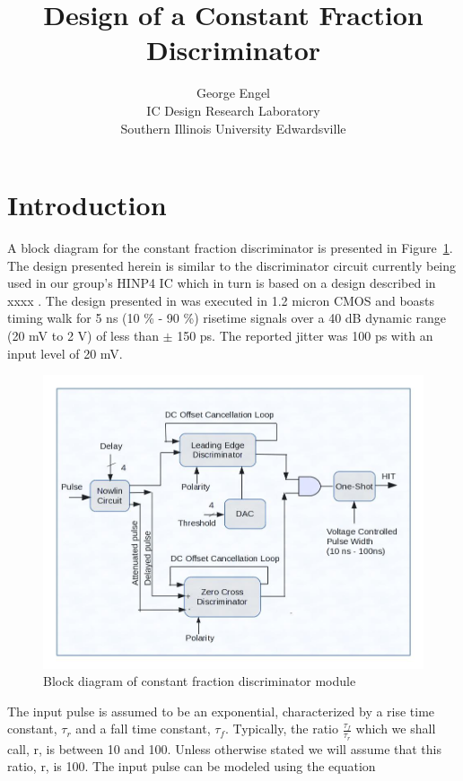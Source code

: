 \documentclass[12pt, onecolumn]{IEEEtran}
\author{George Engel\\
IC Design Research Laboratory\\
Southern Illinois University Edwardsville\\
}
\title{Design of a Constant Fraction Discriminator}
\begin{document}

\maketitle


\section*{Introduction}


A block diagram for the constant fraction discriminator is presented in Figure~\ref{FIG:CFD_BLOCK_DIAGRAM}.
The design presented herein is similar to the discriminator circuit currently being used in our group's HINP4 IC which in turn is based on a design described in xxxx . The design presented in \cite{507173} was executed in 1.2 micron CMOS and boasts timing walk for 5 ns (10 \% - 90 \%) risetime signals over a 40 dB dynamic range (20 mV to 2 V) of less than $\pm$ 150 ps.  The reported jitter was 100 ps with an input level of 20 mV. 


\begin{figure}[htbp!]
	\centering
 	\includegraphics[scale=0.5,keepaspectratio=true]{./images/cfd_block_diagram.jpg} 	
 	\caption{Block diagram of constant fraction discriminator module}
 	\label{FIG:CFD_BLOCK_DIAGRAM}
\end{figure}


The input pulse is assumed to be an exponential, characterized by a rise time constant, $\tau_r$ and a fall time constant, $\tau_f$.  Typically, the ratio $\frac{\tau_f}{\tau_r}$ which we shall call, r, is between 10 and 100. Unless otherwise stated we will assume that this ratio, r, is 100. The input pulse can be modeled using the equation \\
\end{document}
